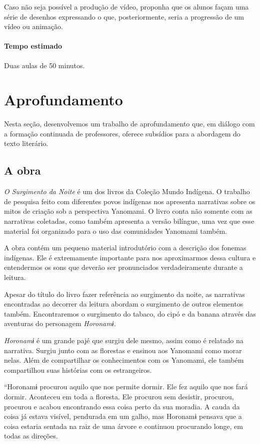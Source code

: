 \documentclass[12pt]{extarticle}
\begin{document}
{Caso não seja possível a produção de vídeo, proponha que os alunos façam 
uma série de desenhos expressando o que, posteriormente, seria a progressão 
de um vídeo ou animação.

\paragraph{Tempo estimado} Duas aulas de 50 minutos.


\section{Aprofundamento}


Nesta seção, desenvolvemos um trabalho de aprofundamento que, em diálogo
com a formação continuada de professores, oferece subsídios para a
abordagem do texto literário.

\subsection{A obra}

\emph{O Surgimento da Noite} é um dos livros da Coleção Mundo Indígena.
O trabalho de pesquisa feito com diferentes povos indígenas nos
apresenta narrativas sobre os mitos de criação sob a perspectiva
Yanomami. O livro conta não somente com as narrativas coletadas, como
também apresenta a versão bilíngue, uma vez que esse material foi
organizado para o uso das comunidades Yanomami também.

A obra contém um pequeno material introdutório com a descrição dos
fonemas indígenas. Ele é extremamente importante para nos aproximarmos
dessa cultura e entendermos os sons que deverão ser pronunciados
verdadeiramente durante a leitura.

Apesar do título do livro fazer referência ao surgimento da noite, as
narrativas encontradas ao decorrer da leitura abordam o surgimento de
outros elementos também. Encontraremos o surgimento do tabaco, do cipó e
da banana através das aventuras do personagem \emph{Horonamɨ.}

\emph{Horonamɨ} é um grande pajé que surgiu dele mesmo, assim como é
relatado na narrativa. Surgiu junto com as florestas e ensinou aos
Yanomami como morar nelas. Além de compartilhar os conhecimentos com os
Yanomami, ele também compartilhou suas histórias com os estrangeiros.

``Horonamɨ procurou aquilo que nos permite dormir. Ele fez aquilo que nos 
fará dormir. Aconteceu em toda a floresta. Ele procurou sem desistir, procurou, 
procurou e acabou encontrando essa coisa perto da sua moradia. A cauda da coisa 
já estava visível, pendurada em um galho, mas Horonamɨ pensava que a coisa estaria 
sentada na raiz de uma árvore e continuou procurando longe, em todas as direções.

}
\end{document}
